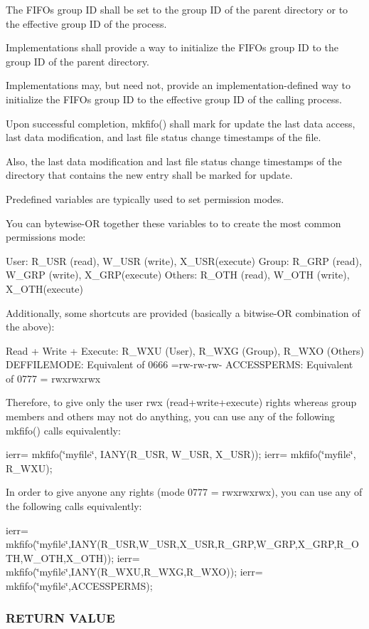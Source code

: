 The F\+I\+FO\textquotesingle{}s group ID shall be set to the group ID of the parent directory or to the effective group ID of the process.

Implementations shall provide a way to initialize the F\+I\+FO\textquotesingle{}s group ID to the group ID of the parent directory.

Implementations may, but need not, provide an implementation-\/defined way to initialize the F\+I\+FO\textquotesingle{}s group ID to the effective group ID of the calling process.

Upon successful completion, mkfifo() shall mark for update the last data access, last data modification, and last file status change timestamps of the file.

Also, the last data modification and last file status change timestamps of the directory that contains the new entry shall be marked for update.

Predefined variables are typically used to set permission modes.

You can bytewise-\/\+OR together these variables to to create the most common permissions mode\+:

User\+: R\+\_\+\+U\+SR (read), W\+\_\+\+U\+SR (write), X\+\_\+\+U\+S\+R(execute) Group\+: R\+\_\+\+G\+RP (read), W\+\_\+\+G\+RP (write), X\+\_\+\+G\+R\+P(execute) Others\+: R\+\_\+\+O\+TH (read), W\+\_\+\+O\+TH (write), X\+\_\+\+O\+T\+H(execute)

Additionally, some shortcuts are provided (basically a bitwise-\/\+OR combination of the above)\+:

Read + Write + Execute\+: R\+\_\+\+W\+XU (User), R\+\_\+\+W\+XG (Group), R\+\_\+\+W\+XO (Others) D\+E\+F\+F\+I\+L\+E\+M\+O\+DE\+: Equivalent of 0666 =rw-\/rw-\/rw-\/ A\+C\+C\+E\+S\+S\+P\+E\+R\+MS\+: Equivalent of 0777 = rwxrwxrwx

Therefore, to give only the user rwx (read+write+execute) rights whereas group members and others may not do anything, you can use any of the following mkfifo() calls equivalently\+:

ierr= mkfifo(\char`\"{}myfile\char`\"{}, I\+A\+N\+Y(\+R\+\_\+\+U\+S\+R, W\+\_\+\+U\+S\+R, X\+\_\+\+U\+S\+R)); ierr= mkfifo(\char`\"{}myfile\char`\"{}, R\+\_\+\+W\+XU);

In order to give anyone any rights (mode 0777 = rwxrwxrwx), you can use any of the following calls equivalently\+:

ierr= mkfifo(\char`\"{}myfile\char`\"{},I\+A\+N\+Y(\+R\+\_\+\+U\+S\+R,\+W\+\_\+\+U\+S\+R,\+X\+\_\+\+U\+S\+R,\+R\+\_\+\+G\+R\+P,\+W\+\_\+\+G\+R\+P,\+X\+\_\+\+G\+R\+P,\+R\+\_\+\+O\+T\+H,\+W\+\_\+\+O\+T\+H,\+X\+\_\+\+O\+T\+H)); ierr= mkfifo(\char`\"{}myfile\char`\"{},I\+A\+N\+Y(\+R\+\_\+\+W\+X\+U,\+R\+\_\+\+W\+X\+G,\+R\+\_\+\+W\+X\+O)); ierr= mkfifo(\char`\"{}myfile\char`\"{},A\+C\+C\+E\+S\+S\+P\+E\+R\+MS); \subsubsection*{R\+E\+T\+U\+RN V\+A\+L\+UE}

